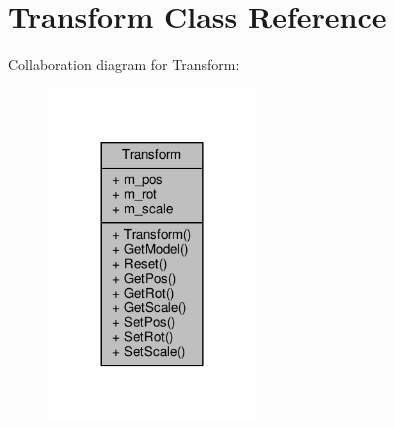 \hypertarget{class_transform}{}\section{Transform Class Reference}
\label{class_transform}


Collaboration diagram for Transform\+:\nopagebreak
\begin{figure}[H]
\begin{center}
\leavevmode
\includegraphics[width=156pt]{class_transform__coll__graph}
\end{center}
\end{figure}
